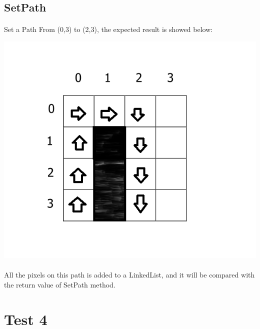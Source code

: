 \documentclass[11pt, a4paper]{report}
\begin{document}
\subsection{SetPath}
\paragraph{}Set a Path From (0,3) to (2,3), the expected result is showed below:\\
\begin{center}
\includegraphics[scale=0.4]{./image/Test3SetPath.png}
\end{center}
\paragraph{}All the pixels on this path is added to a LinkedList, and it will be compared with the return value of SetPath method.



\section{Test 4}
\end{document}
